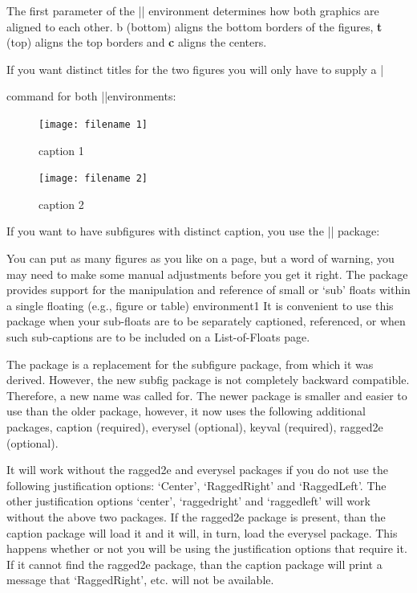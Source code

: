 The first parameter of the |\minipage| environment determines how both graphics are aligned to each other. b (bottom) aligns the bottom borders of the figures, \textbf{t} (top) aligns the top borders and \textbf{c} aligns the centers.

If you want distinct titles for the two figures you will only have to supply a |\caption| command for both |\minipage|environments:

\begin{teX}
\begin{figure}[htbp]
  \centering
  \begin{minipage}[b]{5 cm}
    \texttt{[image: filename 1]} 
    \caption{caption 1}
    \label{labelname 1}
  \end{minipage}
  \begin{minipage}[b]{5 cm}
    \texttt{[image: filename 2]}  
    \caption{caption 2}
    \label{labelname 2}
  \end{minipage}
\end{figure}
\end{teX}


If you want to have subfigures with distinct caption, you use the |\subfig| package:


You can put as many figures as you like on a page, but a word of warning, you may need to make some manual adjustments before you get it right. The package provides support for the manipulation and reference of small or ‘sub’ floats within a single floating (e.g., figure or table) environment1 It is convenient to use this
package when your sub-floats are to be separately captioned, referenced, or when such
sub-captions are to be included on a List-of-Floats page.

The package is a replacement for the subfigure package, from which it was derived.
However, the new subfig package is not completely backward compatible.
Therefore, a new name was called for. The newer package is smaller and easier to use
than the older package, however, it now uses the following additional packages, 
caption (required), 
everysel (optional), 
keyval (required), 
ragged2e (optional).

It will work without the ragged2e and everysel packages if you do not use the following
justification options: ‘Center’, ‘RaggedRight’ and ‘RaggedLeft’. The other justification
options ‘center’, ‘raggedright’ and ‘raggedleft’ will work without the above two packages. If the ragged2e package is present, than the caption package will load it and it
will, in turn, load the everysel package. This happens whether or not you will be using
the justification options that require it. If it cannot find the ragged2e package, than the
caption package will print a message that ‘RaggedRight’, etc. will not be available.



